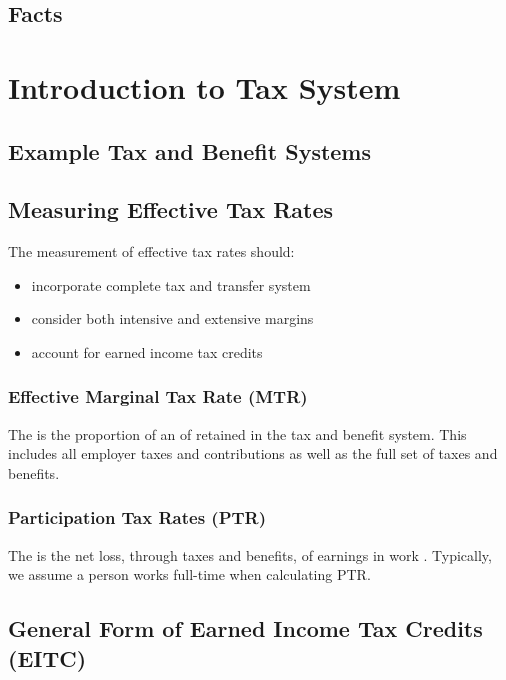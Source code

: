     \subsection{Facts}

\section{Introduction to Tax System}

    \subsection{Example Tax and Benefit Systems}
    
    \subsection{Measuring Effective Tax Rates}

        The measurement of effective tax rates should:
        \begin{itemize}
            \item incorporate complete tax and transfer system
            \item consider both intensive and extensive margins
            \item account for earned income tax credits
        \end{itemize}

        \subsubsection{Effective Marginal Tax Rate (MTR)}

            The  is the proportion of an  of  retained in the tax and benefit system. This includes all employer taxes and contributions as well as the full set of taxes and benefits.
            
        \subsubsection{Participation Tax Rates (PTR)}

            The  is the net loss, through taxes and benefits, of earnings in work . Typically, we assume a person works full-time when calculating PTR.

    \subsection{General Form of Earned Income Tax Credits (EITC)}

